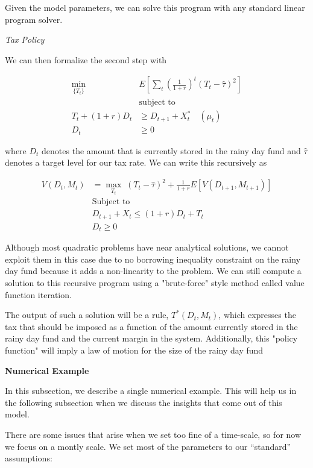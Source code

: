 Given the model parameters, we can solve this program with any standard linear program solver.

\textit{Tax Policy}

We can then formalize the second step with

\begin{align*}
  \min_{\{T_t\}} \; & E \left[ \sum_{t} \left( \frac{1}{1 + r} \right)^t (T_t - \hat{\tau})^2 \right] \\
  &\text{subject to} \\
  T_t + (1 + r) D_t &\geq D_{t+1} + X^*_t \quad (\mu_t) \\
  D_t &\geq 0
\end{align*}

where $D_t$ denotes the amount that is currently stored in the rainy day fund and $\hat{\tau}$
denotes a target level for our tax rate. We can write this recursively as

\begin{align*}
  V(D_t, M_t) &= \max_{T_t} \; (T_t - \hat{\tau})^2 + \frac{1}{1 + r} E [V(D_{t+1}, M_{t+1})] \\
  &\text{Subject to} \\
  &D_{t+1} + X_{t} \leq (1 + r) D_t + T_t \\
  &D_t \geq 0
\end{align*}

Although most quadratic problems have near analytical solutions, we cannot exploit them in this case
due to no borrowing inequality constraint on the rainy day fund because it adds a non-linearity to
the problem. We can still compute a solution to this recursive program using a "brute-force" style
method called value function iteration.

The output of such a solution will be a rule, $T^*(D_t, M_t)$, which expresses the tax that should
be imposed as a function of the amount currently stored in the rainy day fund and the current margin
in the system. Additionally, this "policy function" will imply a law of motion for the size of the
rainy day fund

\textbf{Numerical Example}

In this subsection, we describe a single numerical example. This will help us in the following
subsection when we discuss the insights that come out of this model.

There are some issues that arise when we set too fine of a time-scale, so for now we focus on a
montly scale. We set most of the parameters to our ``standard'' assumptions:

